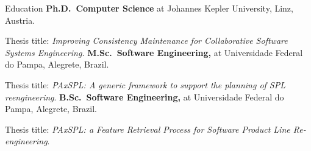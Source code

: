 \begin{rubric}{Education}
\entry*[2021 -- 2023]%
	\textbf{Ph.D.~Computer Science} at Johannes Kepler University, Linz, Austria.
	\par 
    Thesis title: \emph{Improving Consistency Maintenance for Collaborative Software Systems Engineering.}
%
\entry*[2019 -- 2020]%
	\textbf{M.Sc.~Software Engineering,} at Universidade Federal do Pampa, Alegrete, Brazil.\par
	Thesis title: \emph{PAxSPL: A generic framework to support the planning of SPL reengineering}.
% 
\entry*[2012 -- 2018]%
	\textbf{B.Sc.~Software Engineering,} at Universidade Federal do Pampa, Alegrete, Brazil.\par
	Thesis title: \emph{PAxSPL: a Feature Retrieval Process for Software Product Line Re-engineering}.
\end{rubric}